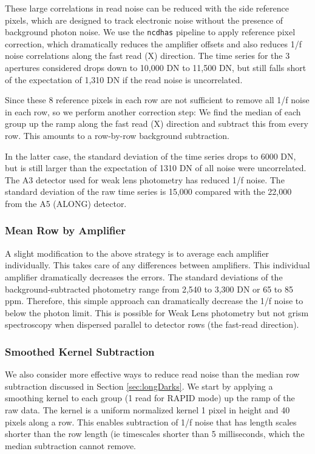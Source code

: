 \documentclass{aastex62}
\begin{document}
These large correlations in read noise can be reduced with the side reference pixels, which are designed to track electronic noise without the presence of background photon noise.
We use the \texttt{ncdhas} pipeline to apply reference pixel correction, which dramatically reduces the amplifier offsets and also reduces 1/f noise correlations along the fast read (X) direction.
The time series for the 3 apertures considered drops down to 10,000 DN to 11,500 DN, but still falls short of the expectation of 1,310 DN if the read noise is uncorrelated.

Since these 8 reference pixels in each row are not sufficient to remove all 1/f noise in each row, so we perform another correction step:
We find the median of each group up the ramp along the fast read (X) direction and subtract this from every row.
This amounts to a row-by-row background subtraction.

In the latter case, the standard deviation of the time series drops to 6000 DN, but is still larger than the expectation of 1310 DN of all noise were uncorrelated.
The A3 detector used for weak lens photometry has reduced 1/f noise.
The standard deviation of the raw time series is 15,000 compared with the 22,000 from the A5 (ALONG) detector.

\subsubsection{Mean Row by Amplifier}\label{sec:indAmpAvg}
A slight modification to the above strategy is to average each amplifier individually.
This takes care of any differences between amplifiers.
This individual amplifier dramatically decreases the errors.
The standard deviations of the background-subtracted photometry range from 2,540 to 3,300 DN or 65 to 85 ppm.
Therefore, this simple approach can dramatically decrease the 1/f noise to below the photon limit.
This is possible for Weak Lens photometry but not grism spectroscopy when dispersed parallel to detector rows (the fast-read direction).

\subsubsection{Smoothed Kernel Subtraction}\label{sec:smoothKernelSub}

We also consider more effective ways to reduce read noise than the median row subtraction discussed in Section \ref{sec:longDarks}.
We start by applying a smoothing kernel to each group (1 read for RAPID mode) up the ramp of the raw data.
The kernel is a uniform normalized kernel 1 pixel in height and 40 pixels along a row.
This enables subtraction of 1/f noise that has length scales shorter than the row length (ie timescales shorter than 5 milliseconds, which the median subtraction cannot remove.
\end{document}
